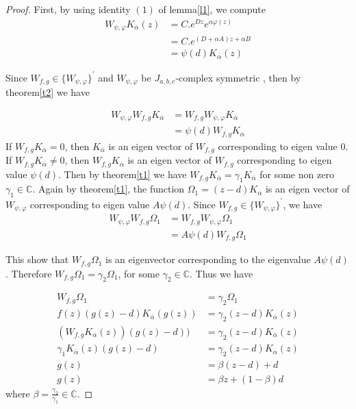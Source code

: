 \documentclass[10pt,a4paper]{amsart}
\numberwithin{equation}{section}
\begin{document}
\begin{proof}
First, by using identity $(1)$ of lemma\ref{l1}, we compute
\begin{align*}
    W_{\psi, \varphi}K_{\overline{\alpha}}(z)&= C.e^{Dz}e^{\alpha \varphi(z)}\\
    &= C. e^{(D+\alpha A)z+\alpha B}\\
    &= \psi(d)K_{\overline{\alpha}}(z)
\end{align*}
    

  Since $W_{f,g} \in \{W_{\psi, \varphi}\}^{'}$ and $W_{\psi, \varphi}$ be $J_{a,b,c}$-complex symmetric , then by theorem\ref{t2} we have

  \begin{align*}
  W_{\psi, \varphi}W_{f,g}K_{\overline{\alpha}}&= W_{f,g}W_{\psi, \varphi}K_{\overline{\alpha}}\\
  &= \psi(d)W_{f,g}K_{\overline{\alpha}}
  \end{align*}
If $W_{f,g}K_{\overline{\alpha}}=0$, then $K_{\overline{\alpha}}$ is an eigen vector of $W_{f,g}$ corresponding to eigen value 0.
If $W_{f,g}K_{\overline{\alpha}}\neq 0$, then $W_{f,g}K_{\overline{\alpha}}$ is an eigen vector of $W_{f,g}$ corresponding to eigen value 
$\psi(d)$. Then by theorem\ref{t1} we have $W_{f,g}K_{\overline{\alpha}}= \gamma_{1}K_{\overline{\alpha}}$ for some non zero $\gamma_{1}\in \mathbb{C}$. Again by theorem\ref{t1}, the function $\Omega_{1}= (z-d)K_{\overline{\alpha}}$ is an eigen vector of $W_{\psi, \varphi}$ corresponding to eigen value $A\psi(d)$.
Since $W_{f,g} \in \{W_{\psi, \varphi}\}^{'}$, we have 
\begin{align*}W_{\psi, \varphi}W_{f,g}\Omega_{1}&=W_{f,g}W_{\psi, \varphi}\Omega_{1}\\
&=A\psi(d) W_{f,g}\Omega_{1} 
\end{align*}

This show that $W_{f,g}\Omega_{1}$  is an eigenvector corresponding to the eigenvalue $A\psi(d)$. Therefore $W_{f,g}\Omega_{1}=\gamma_{2}\Omega_{1}$, for some $\gamma_{2} \in \mathbb{C}$. Thus we have

\begin{align*}
   W_{f,g}\Omega_{1}&=\gamma_{2}\Omega_{1}\\
    f(z) (g(z)-d)K_{\overline{\alpha}}(g(z))&= \gamma_{2} (z-d)K_{\overline{\alpha}}(z)\\
    (W_{f,g}K _{\overline{\alpha}}(z))(g(z)-d))&= \gamma_{2}(z-d)K_{\overline{\alpha}}(z)\\
    \gamma_{1}K_{\overline{\alpha}}(z)(g(z)-d)&=\gamma_{2} (z-d)K_{\overline{\alpha}}(z)\\
    g(z)&=\beta(z-d)+d\\
    g(z)&=\beta z+ (1-\beta) d
\end{align*}
where $\beta=\frac{\gamma_{2}}{\gamma_{1}} \in \mathbb{C}.$


\end{proof}
\end{document}
